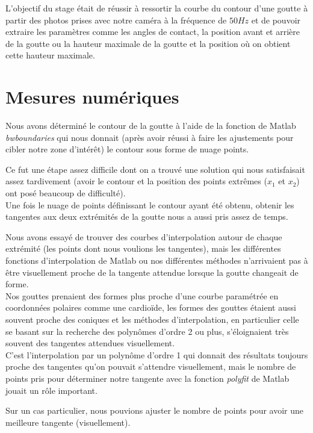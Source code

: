 L'objectif du stage était de réussir à ressortir la courbe du contour d'une goutte à partir des photos prises avec notre caméra à la fréquence de $50Hz$ et de pouvoir extraire les paramètres comme les angles de contact, la position avant et arrière de la goutte ou la hauteur maximale de la goutte et la position où on obtient cette hauteur maximale.

\section{Mesures numériques}

Nous avons déterminé le contour de la goutte à l'aide de la fonction de Matlab \emph{bwboundaries} qui nous donnait (après avoir réussi à faire les ajustements pour cibler notre zone d'intérêt) le contour sous forme de nuage points.

Ce fut une étape assez difficile dont on a trouvé une solution qui nous satisfaisait assez tardivement (avoir le contour et la position des points extrêmes ($x_{1}$ et $x_{2}$) ont posé beaucoup de difficulté).  \\

Une fois le nuage de points définissant le contour ayant été obtenu, obtenir les tangentes aux deux extrémités de la goutte nous a aussi pris assez de temps.

Nous avons essayé de trouver des courbes d'interpolation autour de chaque extrémité (les points dont nous voulions les tangentes), mais les différentes fonctions d'interpolation de Matlab ou nos différentes méthodes n'arrivaient pas à être visuellement proche de la tangente attendue lorsque la goutte changeait de forme.\\

Nos gouttes prenaient des formes plus proche d'une courbe paramétrée en coordonnées polaires comme une cardioïde, les formes des gouttes étaient aussi souvent proche des coniques et les méthodes d'interpolation, en particulier celle se basant sur la recherche des polynômes d'ordre 2 ou plus, s'éloignaient très souvent des tangentes attendues visuellement.\\

C'est l'interpolation par un polynôme d'ordre 1 qui donnait des résultats toujours proche des tangentes qu'on pouvait s'attendre visuellement, mais le nombre de points pris pour déterminer notre tangente avec la fonction \emph{polyfit} de Matlab jouait un rôle important.

Sur un cas particulier, nous pouvions ajuster le nombre de points pour avoir une meilleure tangente (visuellement).

